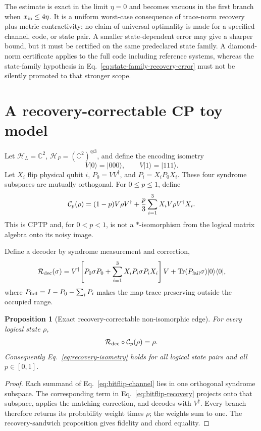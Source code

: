 \documentclass[11pt]{article}
\newtheorem{proposition}{Proposition}
\newcommand{\Tr}{\operatorname{Tr}}
\begin{document}
The estimate is exact in the limit \(\eta=0\) and becomes vacuous in the first
branch when \(x_{\rm in}\leq4\eta\).  It is a uniform worst-case consequence of
trace-norm recovery plus metric contractivity; no claim of universal
optimality is made for a specified channel, code, or state pair.  A smaller
state-dependent error may give a sharper bound, but it must be certified on
the same predeclared state family.  A diamond-norm certificate applies to the
full code including reference systems, whereas the state-family hypothesis in
Eq.~\eqref{eq:state-family-recovery-error} must not be silently promoted to
that stronger scope.

\section{A recovery-correctable CP toy model}

Let \(\mathcal H_L=\mathbb C^2\),
\(\mathcal H_P=(\mathbb C^2)^{\otimes3}\), and define the encoding isometry
\begin{equation}
 V|0\rangle=|000\rangle,\qquad V|1\rangle=|111\rangle.
 \label{eq:bitflip-encoding}
\end{equation}
Let \(X_i\) flip physical qubit \(i\), \(P_0=VV^\dagger\), and
\(P_i=X_iP_0X_i\).  These four syndrome subspaces are mutually orthogonal.
For \(0\leq p\leq1\), define
\begin{equation}
 \mathcal C_p(\rho)
 =(1-p)V\rho V^\dagger+{p\over3}\sum_{i=1}^3X_iV\rho V^\dagger X_i.
 \label{eq:bitflip-channel}
\end{equation}
This is CPTP and, for \(0<p<1\), is not a \(*\)-isomorphism from the logical
matrix algebra onto its noisy image.

Define a decoder by syndrome measurement and correction,
\begin{equation}
 \mathcal R_{\rm dec}(\sigma)=
 V^\dagger\!\left[P_0\sigma P_0+
 \sum_{i=1}^3X_iP_i\sigma P_iX_i\right]V
 +\Tr(P_{\rm fail}\sigma)|0\rangle\langle0|,
 \label{eq:bitflip-recovery}
\end{equation}
where \(P_{\rm fail}=I-P_0-\sum_iP_i\) makes the map trace preserving outside
the occupied range.

\begin{proposition}[Exact recovery-correctable non-isomorphic edge]
For every logical state \(\rho\),
\begin{equation}
 \mathcal R_{\rm dec}\circ\mathcal C_p(\rho)=\rho.
 \label{eq:toy-recovery-identity}
\end{equation}
Consequently Eq.~\eqref{eq:recovery-isometry} holds for all logical state
pairs and all \(p\in[0,1]\).
\end{proposition}
\begin{proof}
Each summand of Eq.~\eqref{eq:bitflip-channel} lies in one orthogonal syndrome
subspace.  The corresponding term in Eq.~\eqref{eq:bitflip-recovery} projects
onto that subspace, applies the matching correction, and decodes with \(V^\dagger\).
Every branch therefore returns its probability weight times \(\rho\); the
weights sum to one.  The recovery-sandwich proposition gives fidelity and
chord equality.
\end{proof}
\end{document}
